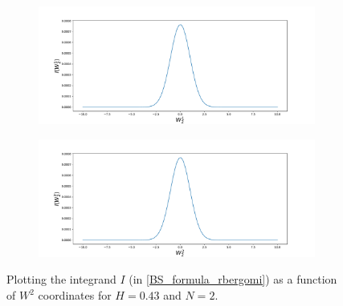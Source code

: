 \documentclass[11pt]{article}
\begin{document}
\begin{figure}[h!]
	\centering
	\begin{subfigure}{.5\textwidth}
		\centering
		\includegraphics[width=1\linewidth]{./figures/integrand_plotting_rBergomi/1D_plots/N_2/H_043/Bergomi_integrand_K_1_H_043_W21_N_2}
		\caption{}
		\label{fig:sub3}
	\end{subfigure}%
	\begin{subfigure}{.5\textwidth}
		\centering
		\includegraphics[width=1\linewidth]{./figures/integrand_plotting_rBergomi/1D_plots/N_2/H_043/Bergomi_integrand_K_1_H_043_W22_N_2}
		\caption{}
		\label{fig:sub4}
	\end{subfigure}
	\caption{Plotting the integrand $I$ (in \eqref{BS_formula_rbergomi}) as a function of $W^2$ coordinates for $H=0.43$ and $N=2$.}
	\label{fig:Integrand_H_043_N_2_W_2}
\end{figure}
\end{document}
